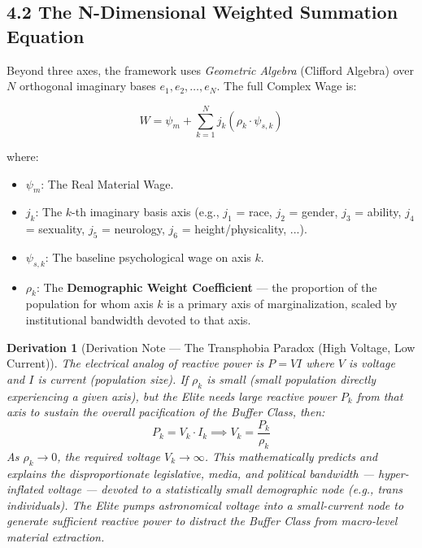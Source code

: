 \documentclass[12pt]{book}
\numberwithin{equation}{chapter}
\newtheorem{derivation}{Derivation}[chapter]
\begin{document}
\subsection{4.2 The N-Dimensional Weighted Summation Equation}

    Beyond three axes, the framework uses \emph{Geometric Algebra} (Clifford Algebra) over $N$ orthogonal imaginary bases $e_1, e_2, \ldots, e_N$. The full Complex Wage is:
  

\begin{equation}
      \boxed{W = \psi_m + \sum_{k=1}^{N} j_k \left(\rho_k \cdot \psi_{s,k}\right)}
\label{eq:uef-ndim-allocation}
\end{equation}

where:

\begin{itemize}

\item $\psi_m$: The Real Material Wage.

\item $j_k$: The $k$-th imaginary basis axis (e.g., $j_1$ = race, $j_2$ = gender, $j_3$ = ability, $j_4$ = sexuality, $j_5$ = neurology, $j_6$ = height/physicality, ...).

\item $\psi_{s,k}$: The baseline psychological wage on axis $k$.

\item $\rho_k$: The \textbf{Demographic Weight Coefficient} — the proportion of the population for whom axis $k$ is a primary axis of marginalization, scaled by institutional bandwidth devoted to that axis.

\end{itemize}

\begin{derivation}[Derivation Note — The Transphobia Paradox (High Voltage, Low Current)]
The electrical analog of reactive power is $P = VI$ where $V$ is voltage and $I$ is current (population size). If $\rho_k$ is small (small population directly experiencing a given axis), but the Elite needs large reactive power $P_k$ from that axis to sustain the overall pacification of the Buffer Class, then:
      \[ P_k = V_k \cdot I_k \implies V_k = \frac{P_k}{\rho_k} \]
    As $\rho_k \to 0$, the required voltage $V_k \to \infty$. This mathematically predicts and explains the disproportionate legislative, media, and political bandwidth — hyper-inflated voltage — devoted to a statistically small demographic node (e.g., trans individuals). The Elite pumps astronomical voltage into a small-current node to generate sufficient reactive power to distract the Buffer Class from macro-level material extraction.
  \end{derivation}
\end{document}
